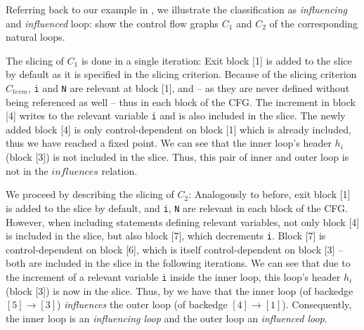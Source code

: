 \begin{example}
    Referring back to our example in , we illustrate the classification as \emph{influencing} and \emph{influenced} loop:  show the control flow graphs $C_1$ and $C_2$ of the corresponding natural loops.
    
    The slicing of $C_1$ is done in a single iteration: Exit block [1] is added to the slice by default as it is specified in the slicing criterion. Because of the slicing criterion $C_{term}$, \texttt{i} and \texttt{N} are relevant at block [1], and -- as they are never defined without being referenced as well -- thus in each block of the CFG. The increment in block [4] writes to the relevant variable \texttt{i} and is also included in the slice. The newly added block [4] is only control-dependent on block [1] which is already included, thus we have reached a fixed point. We can see that the inner loop's header $h_i$ (block [3]) is not included in the slice. Thus, this pair of inner and outer loop is not in the $influences$ relation.

    We proceed by describing the slicing of $C_2$: Analogously to before, exit block [1] is added to the slice by default, and \texttt{i}, \texttt{N} are relevant in each block of the CFG. However, when including statements defining relevant variables, not only block [4] is included in the slice, but also block [7], which decrements \texttt{i}. Block [7] is control-dependent on block [6], which is itself control-dependent on block [3] -- both are included in the slice in the following iterations. We can see that due to the increment of a relevant variable \texttt{i} inside the inner loop, this loop's header $h_i$ (block [3]) is now in the slice. Thus, by  we have that the inner loop (of backedge $[5] \rightarrow [3]$) \emph{influences} the outer loop (of backedge $[4] \rightarrow [1]$). Consequently, the inner loop is an \emph{influencing loop} and the outer loop an \emph{influenced loop}.
\end{example}

